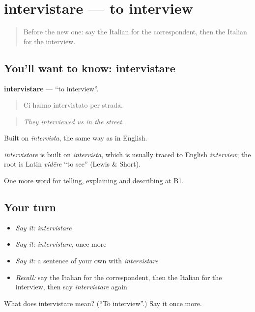 \section[intervistare]{intervistare — to interview}

\label{lesson:IT-C283-intervistare}



\begin{quote}
Before the new one: say the Italian for the correspondent, then the Italian for the interview.
\end{quote}

\subsection*{You'll want to know: intervistare}
\textbf{intervistare} — \textquotedblleft{}to interview\textquotedblright{}.

\begin{quote}
Ci hanno intervistato per strada.
\end{quote}

\begin{quote}
\emph{They interviewed us in the street.}
\end{quote}

Built on \emph{intervista}, the same way as in English.

\begin{cousinweb}
\emph{intervistare} is built on \emph{intervista}, which is usually traced to English \emph{interview}; the root is Latin \emph{vidēre} \textquotedblleft{}to see\textquotedblright{} (Lewis \& Short).
\end{cousinweb}

\begin{grammarlens}[title={What you've built}]
One more word for telling, explaining and describing at B1.
\end{grammarlens}

\subsection*{Your turn}
\begin{itemize}
\raggedright
  \item \emph{Say it:} \emph{intervistare}
  \item \emph{Say it:} \emph{intervistare}, once more
  \item \emph{Say it:} a sentence of your own with \emph{intervistare}
  \item \emph{Recall:} say the Italian for the correspondent, then the Italian for the interview, then say \emph{intervistare} again
\end{itemize}

\begin{tcolorbox}[breakable,colback=teal!4,colframe=teal!35!black,title={Before you move on}]
What does intervistare mean? (\textquotedblleft{}To interview\textquotedblright{}.) Say it once more.
\end{tcolorbox}
